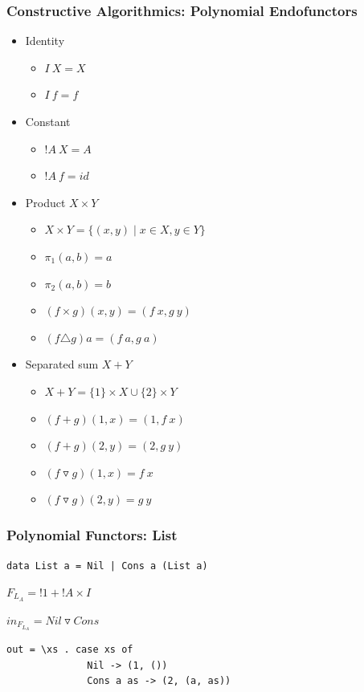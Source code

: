 \documentclass{beamer}
\begin{document}
\begin{frame}[fragile]
  \frametitle{Constructive Algorithmics: Polynomial Endofunctors}
\begin{itemize}
  \item Identity
  \begin{itemize}
    \item $I \ X = X$
    \item $I \ f = f$
  \end{itemize}
  \item Constant
  \begin{itemize}
    \item $!A \ X = A$
    \item $!A \ f = id$
  \end{itemize}
  \item Product $X \times Y$
  \begin{itemize}
    \item $X \times Y = \{(x, y) \mid x \in X, y \in Y\}$
    \item $\pi_1 (a, b) = a$
    \item $\pi_2 (a, b) = b$
    \item $(f \times g) (x, y) = (f \ x, g \ y)$
    \item $(f \triangle g) a = (f \ a, g \ a)$
  \end{itemize}
  \item Separated sum $X + Y$
  \begin{itemize}
    \item $X + Y = \{1\} \times X \cup \{2\} \times Y$
    \item $(f + g) (1, x) = (1, f \ x)$
    \item $(f + g) (2, y) = (2, g \ y)$
    \item $(f \triangledown g) (1, x) = f \ x $
    \item $(f \triangledown g) (2, y) = g \ y $
  \end{itemize}
\end{itemize}
\end{frame}

\begin{frame}[fragile]
  \frametitle{Polynomial Functors: List}

\texttt{data List a = Nil | Cons a (List a)}

\vspace{0.5cm}

$F_{L_A} = !1 + !A \times I$

\vspace{0.5cm}

$in_{F_{L_A}} = Nil \triangledown Cons$

\vspace{0.5cm}

\begin{verbatim}
out = \xs . case xs of
              Nil -> (1, ())
              Cons a as -> (2, (a, as))
\end{verbatim}

\end{frame}
\end{document}

